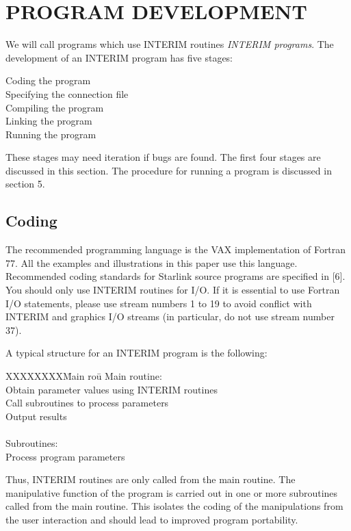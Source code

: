 \section {PROGRAM DEVELOPMENT}
We will call programs which use INTERIM routines {\em INTERIM programs}.
The development of an INTERIM  program has five stages:
\begin{description}
\begin{description}
\item [Coding the program]
\item [Specifying the connection file]
\item [Compiling the program]
\item [Linking the program]
\item [Running the program]
\end{description}
\end{description}
These stages may need iteration if bugs are found.
The first four stages are discussed in this section.
The procedure for running a program is discussed in section 5.
\subsection {Coding}
The recommended programming language is the VAX implementation of Fortran 77.
All the examples and illustrations in this paper use this language.
Recommended coding standards for Starlink source programs are specified in [6].
You should only use INTERIM routines for I/O.
If it is essential to use Fortran I/O statements, please use stream numbers
1 to 19 to avoid conflict with INTERIM and graphics I/O streams (in particular,
do not use stream number 37).

A typical structure for an INTERIM program is the following:
\begin{tabbing}
XXXXXXXX\=Main rou\=\kill
\>Main routine:\\
\>\>Obtain parameter values using INTERIM routines\\
\>\>Call subroutines to process parameters\\
\>\>Output results\\
\\
\>Subroutines:\\
\>\>Process program parameters
\end{tabbing}
Thus, INTERIM routines are only called from the main routine.
The manipulative function of the program is carried out in one or more
subroutines called from the main routine.
This isolates the coding of the manipulations from the user interaction and
should lead to improved program portability.

